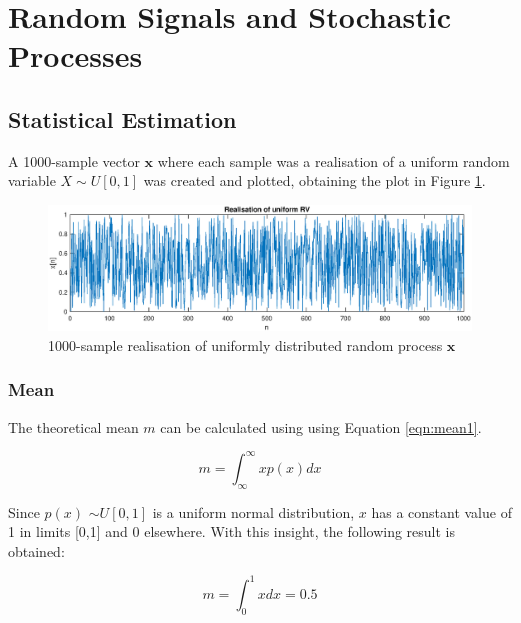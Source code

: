 
\setcounter{page}{1}

\section{Random Signals and Stochastic Processes}


\subsection{Statistical Estimation}

A 1000-sample vector $\textbf{x}$ where each sample was a realisation of a uniform random variable $X \sim \textit{U}[0,1]$ was created and plotted, obtaining the plot in Figure \ref{fig:uniform1}.

\begin{figure}[H]
    \centering
    \includegraphics[width=14cm]{assignment1figs/uni_1.eps}
    \caption{1000-sample realisation of uniformly distributed random process $\textbf{x}$}
    \label{fig:uniform1}
\end{figure}

\subsubsection{Mean}

The theoretical mean $m$ can be calculated using using Equation \ref{eqn:mean1}.

\begin{equation}
    m = \int_{\infty}^{\infty}xp(x)dx
    \label{eqn:mean1}
\end{equation}

\noindent
Since $p(x)$ $\sim \textit{U}[0,1]$ is a uniform normal distribution, $x$ has a constant value of 1 in limits [0,1] and 0 elsewhere. With this insight, the following result is obtained:

\begin{equation}
    m = \int_{0}^{1}xdx = 0.5
    \label{eqn:mean2}
\end{equation}

